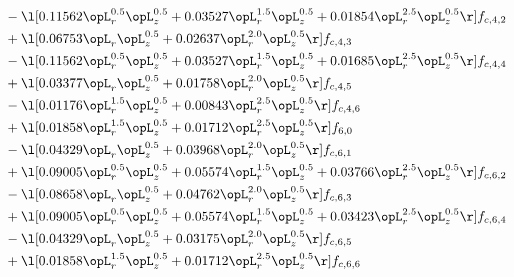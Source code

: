 \begin{alignat}{2}
& - \l[  0.11562 \opL_r^{0.5} \opL_z^{0.5} +  0.03527 \opL_r^{1.5} \opL_z^{0.5} +  0.01854 \opL_r^{2.5} \opL_z^{0.5}  \r] f_{c,4,2} \nonumber \\ 
& + \l[  0.06753 \opL_r \opL_z^{0.5} +  0.02637 \opL_r^{2.0} \opL_z^{0.5}  \r] f_{c,4,3} \nonumber \\ 
& - \l[  0.11562 \opL_r^{0.5} \opL_z^{0.5} +  0.03527 \opL_r^{1.5} \opL_z^{0.5} +  0.01685 \opL_r^{2.5} \opL_z^{0.5}  \r] f_{c,4,4} \nonumber \\ 
& + \l[  0.03377 \opL_r \opL_z^{0.5} +  0.01758 \opL_r^{2.0} \opL_z^{0.5}  \r] f_{c,4,5} \nonumber \\ 
& - \l[  0.01176 \opL_r^{1.5} \opL_z^{0.5} +  0.00843 \opL_r^{2.5} \opL_z^{0.5}  \r] f_{c,4,6} \nonumber \\ 
& + \l[  0.01858 \opL_r^{1.5} \opL_z^{0.5} +  0.01712 \opL_r^{2.5} \opL_z^{0.5}  \r] f_{6,0} \nonumber \\ 
& - \l[  0.04329 \opL_r \opL_z^{0.5} +  0.03968 \opL_r^{2.0} \opL_z^{0.5}  \r] f_{c,6,1} \nonumber \\ 
& + \l[  0.09005 \opL_r^{0.5} \opL_z^{0.5} +  0.05574 \opL_r^{1.5} \opL_z^{0.5} +  0.03766 \opL_r^{2.5} \opL_z^{0.5}  \r] f_{c,6,2} \nonumber \\ 
& - \l[  0.08658 \opL_r \opL_z^{0.5} +  0.04762 \opL_r^{2.0} \opL_z^{0.5}  \r] f_{c,6,3} \nonumber \\ 
& + \l[  0.09005 \opL_r^{0.5} \opL_z^{0.5} +  0.05574 \opL_r^{1.5} \opL_z^{0.5} +  0.03423 \opL_r^{2.5} \opL_z^{0.5}  \r] f_{c,6,4} \nonumber \\ 
& - \l[  0.04329 \opL_r \opL_z^{0.5} +  0.03175 \opL_r^{2.0} \opL_z^{0.5}  \r] f_{c,6,5} \nonumber \\ 
& + \l[  0.01858 \opL_r^{1.5} \opL_z^{0.5} +  0.01712 \opL_r^{2.5} \opL_z^{0.5}  \r] f_{c,6,6} \nonumber \\ 
\end{alignat} 


